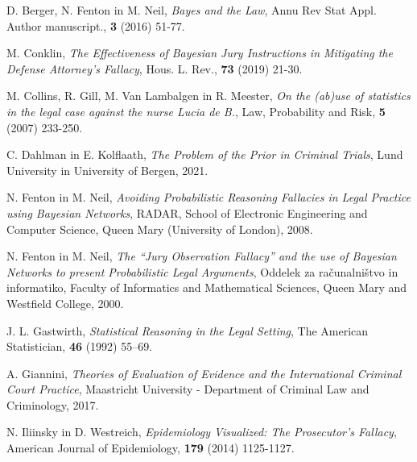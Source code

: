 \documentclass{beamer}
\begin{document}
\begin{frame}
    \begin{thebibliography}{99}
        D. Berger, N. Fenton in M. Neil, \emph{Bayes and the Law}, Annu Rev Stat Appl. Author manuscript., \textbf{3} (2016) 51-77.

        M. Conklin, \emph{The Effectiveness of Bayesian Jury Instructions in Mitigating the Defense Attorney's Fallacy}, Hous. L. Rev., \textbf{73} (2019) 21-30.

        M. Collins, R. Gill, M. Van Lambalgen in R. Meester, \emph{On the (ab)use of statistics in the legal case against the nurse Lucia de B.}, Law, Probability and Risk, \textbf{5} (2007) 233-250.

        C. Dahlman in E. Kolflaath, \emph{The Problem of the Prior in Criminal Trials}, Lund University in University of Bergen, 2021.

    \end{thebibliography}
\end{frame}

\begin{frame}
    \begin{thebibliography}{99}
        N. Fenton in M. Neil, \emph{Avoiding Probabilistic Reasoning Fallacies in Legal Practice using Bayesian Networks}, RADAR, School of Electronic Engineering and Computer Science, Queen Mary (University of London), 2008.

        N. Fenton in M. Neil, \emph{The “Jury Observation Fallacy” and the use of Bayesian Networks to present Probabilistic Legal Arguments}, Oddelek za računalništvo in informatiko, Faculty of Informatics and Mathematical Sciences, Queen Mary and Westfield College, 2000.

        J. L. Gastwirth, \emph{Statistical Reasoning in the Legal Setting}, The American Statistician, \textbf{46} (1992) 55–69.

        A. Giannini, \emph{Theories of Evaluation of Evidence and the International Criminal Court Practice}, Maastricht University - Department of Criminal Law and Criminology, 2017.

        N. Iliinsky in D. Westreich, \emph{Epidemiology Visualized: The Prosecutor’s Fallacy}, American Journal of Epidemiology, \textbf{179} (2014) 1125-1127.

    \end{thebibliography}
\end{frame}
\end{document}
